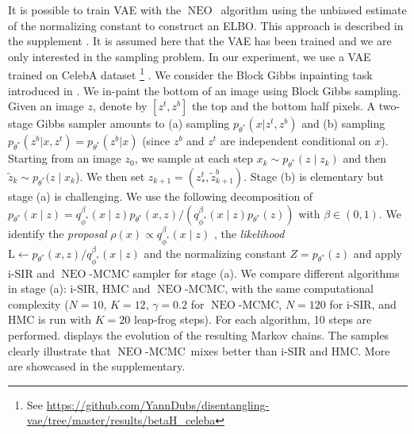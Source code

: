\documentclass{article}
\def\IFIS{\ensuremath{\operatorname{NEO}}}
\def\NEO{{\small \IFIS}}
\newcommand{\ooint}[1]{\left(#1\right)}
\newcommand{\1}{\mathds{1}}
\def\proposal{\rho}
\def\const{Z}
\def\likelihood{\mathrm{L}}
\def\obs{z}
\begin{document}
It is possible to train VAE with the \NEO\ algorithm using the unbiased estimate of the normalizing constant to construct an ELBO. This approach is described in the supplement . It is assumed here that the VAE has been trained and we are only interested in the sampling problem. In our experiment, we use a VAE trained on CelebA dataset \footnote{See  \url{https://github.com/YannDubs/disentangling-vae/tree/master/results/betaH_celeba}} \cite{liu2018large}.  
We consider the Block Gibbs inpainting task introduced in \citep[Section~5.2.2]{levy:hoffman:sohl}. 
 We in-paint the bottom of an image using Block Gibbs sampling. Given an image $\obs$, denote by $[\obs^t, \obs^b] $ the top and the bottom half pixels. A two-stage Gibbs sampler amounts to (a) sampling $p_{\theta^*}(x | \obs^{t}, \obs^b)$ and (b) sampling $p_{\theta^*}(\obs^b|x, \obs^t)= p_{\theta^*}(\obs^b | x)$ (since $\obs^b$ and $\obs^t$ are independent conditional on $x$). 
 Starting from an image $\obs_0$, we sample at each step $x_k\sim p_{\theta^*}(\obs\mid \obs_k)$ and then $\tilde{\obs}_k\sim p_{\theta^*}(\obs\mid x_k$).   We then set $\obs_{k+1}=  ( {\obs}^t_*,\tilde{\obs}^b_{k+1})$. Stage (b) is elementary but stage (a) is challenging. We use the following decomposition  of $p_{\theta^*}(x\mid \obs) = q^\beta_{\phi^*}(x\mid \obs) p_{\theta^*}(x,\obs)/(q^\beta_{\phi^*}(x\mid \obs)p_{\theta^*}(\obs))$ with $\beta \in \ooint{0,1}$. We identify the \emph{proposal} $\proposal(x)\propto  q^\beta_{\phi^*}(x\mid \obs)$ ,  the \emph{likelihood} $\likelihood\leftarrow  p_{\theta^*}(x,\obs)/q^\beta_{\phi^*}(x\mid \obs)$ and the normalizing constant $\const = p_{\theta^*}(\obs)$ and apply i-SIR and \NEO-MCMC sampler for stage (a). 
 We compare  different algorithms in stage (a): i-SIR, HMC and \NEO-MCMC, with the same computational complexity ($N=10$, $K=12$, $\gamma = 0.2$ for \NEO-MCMC, $N=120$ for i-SIR, and HMC is run with $K=20$ leap-frog steps). For each algorithm,  10 steps are performed.
  displays the evolution of the resulting Markov chains. The samples  clearly illustrate that \NEO-MCMC\ mixes better than i-SIR and HMC. More are showcased in the supplementary.
\end{document}
